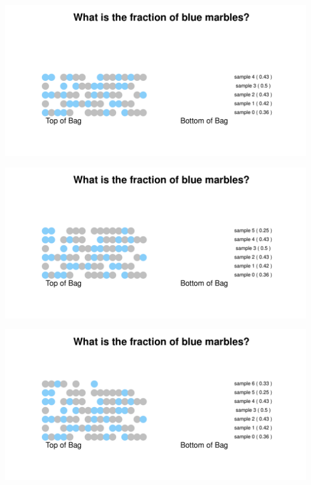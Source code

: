 \documentclass[aspectratio=169]{beamer}
\theoremstyle{principle}
\begin{document}
\begin{frame}
\begin{center}
\includegraphics[scale=0.57]{sample_4.pdf}
\end{center}
\end{frame}

\begin{frame}
\begin{center}
\includegraphics[scale=0.57]{sample_5.pdf}
\end{center}
\end{frame}

\begin{frame}
\begin{center}
\includegraphics[scale=0.57]{sample_6.pdf}
\end{center}
\end{frame}
\end{document}
